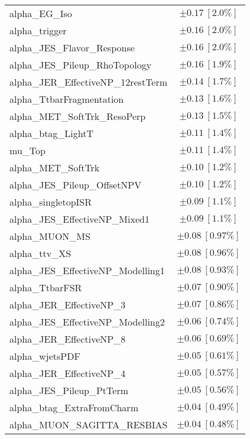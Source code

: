 \begin{table}
\begin{center}
\begin{tabular*}{\textwidth}{@{\extracolsep{\fill}}lc}
alpha\_EG\_Iso         & $\pm 0.17\ [2.0\%] $       \\
alpha\_trigger         & $\pm 0.16\ [2.0\%] $       \\
alpha\_JES\_Flavor\_Response         & $\pm 0.16\ [2.0\%] $       \\
alpha\_JES\_Pileup\_RhoTopology         & $\pm 0.16\ [1.9\%] $       \\
alpha\_JER\_EffectiveNP\_12restTerm         & $\pm 0.14\ [1.7\%] $       \\
alpha\_TtbarFragmentation         & $\pm 0.13\ [1.6\%] $       \\
alpha\_MET\_SoftTrk\_ResoPerp         & $\pm 0.13\ [1.5\%] $       \\
alpha\_btag\_LightT         & $\pm 0.11\ [1.4\%] $       \\
mu\_Top         & $\pm 0.11\ [1.4\%] $       \\
alpha\_MET\_SoftTrk         & $\pm 0.10\ [1.2\%] $       \\
alpha\_JES\_Pileup\_OffsetNPV         & $\pm 0.10\ [1.2\%] $       \\
alpha\_singletopISR         & $\pm 0.09\ [1.1\%] $       \\
alpha\_JES\_EffectiveNP\_Mixed1         & $\pm 0.09\ [1.1\%] $       \\
alpha\_MUON\_MS         & $\pm 0.08\ [0.97\%] $       \\
alpha\_ttv\_XS         & $\pm 0.08\ [0.96\%] $       \\
alpha\_JES\_EffectiveNP\_Modelling1         & $\pm 0.08\ [0.93\%] $       \\
alpha\_TtbarFSR         & $\pm 0.07\ [0.90\%] $       \\
alpha\_JER\_EffectiveNP\_3         & $\pm 0.07\ [0.86\%] $       \\
alpha\_JES\_EffectiveNP\_Modelling2         & $\pm 0.06\ [0.74\%] $       \\
alpha\_JER\_EffectiveNP\_8         & $\pm 0.06\ [0.69\%] $       \\
alpha\_wjetsPDF         & $\pm 0.05\ [0.61\%] $       \\
alpha\_JER\_EffectiveNP\_4         & $\pm 0.05\ [0.57\%] $       \\
alpha\_JES\_Pileup\_PtTerm         & $\pm 0.05\ [0.56\%] $       \\
alpha\_btag\_ExtraFromCharm         & $\pm 0.04\ [0.49\%] $       \\
alpha\_MUON\_SAGITTA\_RESBIAS         & $\pm 0.04\ [0.48\%] $       \\

\end{tabular*}
\end{center}
\end{table}
